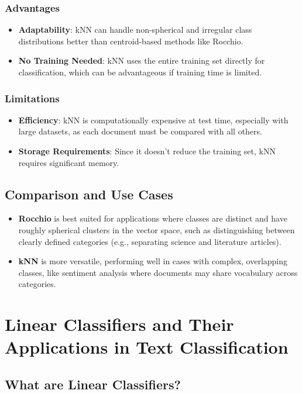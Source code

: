 \documentclass{article}
\begin{document}
\subsubsection*{Advantages}
\begin{itemize}
    \item \textbf{Adaptability}: kNN can handle non-spherical and irregular class distributions better than centroid-based methods like Rocchio.
    \item \textbf{No Training Needed}: kNN uses the entire training set directly for classification, which can be advantageous if training time is limited.
\end{itemize}

\subsubsection*{Limitations}
\begin{itemize}
    \item \textbf{Efficiency}: kNN is computationally expensive at test time, especially with large datasets, as each document must be compared with all others.
    \item \textbf{Storage Requirements}: Since it doesn’t reduce the training set, kNN requires significant memory.
\end{itemize}

\subsection{Comparison and Use Cases}

\begin{itemize}
    \item \textbf{Rocchio} is best suited for applications where classes are distinct and have roughly spherical clusters in the vector space, such as distinguishing between clearly defined categories (e.g., separating science and literature articles).
    \item \textbf{kNN} is more versatile, performing well in cases with complex, overlapping classes, like sentiment analysis where documents may share vocabulary across categories.
\end{itemize}

\section{Linear Classifiers and Their Applications in Text Classification}

\subsection{What are Linear Classifiers?}
\end{document}
